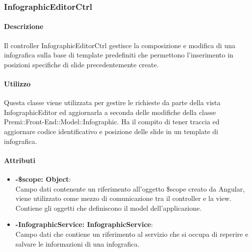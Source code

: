 \newpage
\subsubsection{InfographicEditorCtrl}
	\paragraph{Descrizione}
		Il controller InfographicEditorCtrl gestisce la composizione e modifica di una infografica sulla base di template predefiniti che permettono l'inserimento in posizioni specifiche di slide precedentemente create.
	
	\paragraph{Utilizzo} 
	
		Questa classe viene utilizzata per gestire le richieste da parte della vista InfographicEditor ed aggiornarla a seconda delle modifiche della classe Premi::Front-End::Model::Infographic.
		Ha il compito di tener traccia ed aggiornare codice identificativo e posizione delle slide in un template di infografica.
	\paragraph{Attributi}
	\begin{itemize}
		\item \textbf{-\$scope: Object}:\\
			Campo dati contenente un riferimento all'oggetto \$scope creato da Angular, viene utilizzato come mezzo di comunicazione tra il controller e la view. Contiene gli oggetti che definiscono il model dell'applicazione.
		\item \textbf{-InfographicService: InfographicService}:\\
			Campo dati che contiene un riferimento al servizio che si occupa di reperire e salvare le informazioni di una infografica.
	\end{itemize}
	
